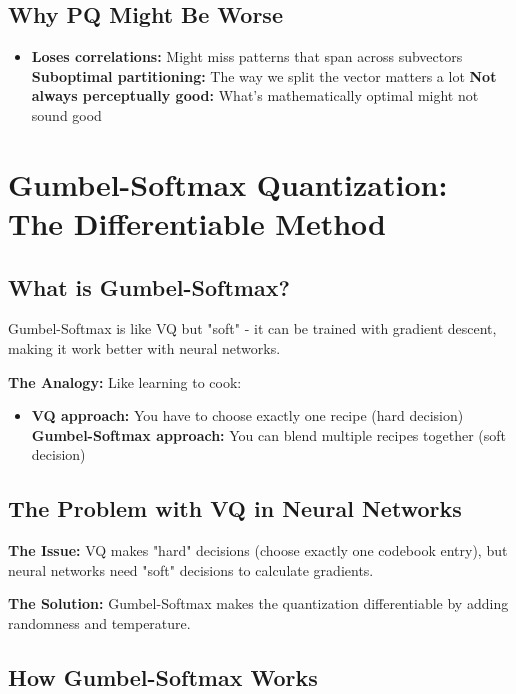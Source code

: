\documentclass[12pt]{article}
\begin{document}
\subsection{Why PQ Might Be Worse}

\begin{itemize}
    \item \textbf{Loses correlations:} Might miss patterns that span across subvectors
    \textbf{Suboptimal partitioning:} The way we split the vector matters a lot
    \textbf{Not always perceptually good:} What's mathematically optimal might not sound good
\end{itemize}

\section{Gumbel-Softmax Quantization: The Differentiable Method}

\subsection{What is Gumbel-Softmax?}

Gumbel-Softmax is like VQ but "soft" - it can be trained with gradient descent, making it work better with neural networks.

\textbf{The Analogy:} Like learning to cook:
\begin{itemize}
    \item \textbf{VQ approach:} You have to choose exactly one recipe (hard decision)
    \textbf{Gumbel-Softmax approach:} You can blend multiple recipes together (soft decision)
\end{itemize}

\subsection{The Problem with VQ in Neural Networks}

\textbf{The Issue:} VQ makes "hard" decisions (choose exactly one codebook entry), but neural networks need "soft" decisions to calculate gradients.

\textbf{The Solution:} Gumbel-Softmax makes the quantization differentiable by adding randomness and temperature.

\subsection{How Gumbel-Softmax Works}
\end{document}
